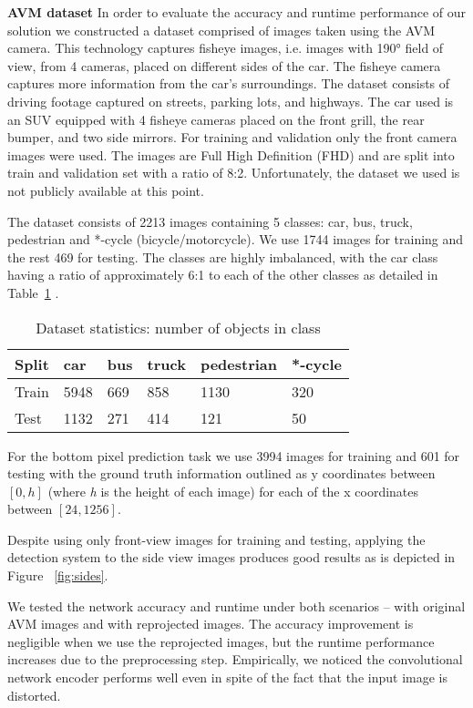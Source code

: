 \documentclass[10pt,twocolumn,letterpaper]{article}
\begin{document}
\textbf{AVM dataset } In order to evaluate the accuracy and runtime performance of our solution we constructed a dataset comprised of images taken using the AVM camera. This technology captures fisheye images, i.e. images with \ang{190} field of view, from 4 cameras, placed on different sides of the car. The fisheye camera captures more information from the car's surroundings. The dataset consists of driving footage captured on streets, parking lots, and highways. The car used is an SUV equipped with 4 fisheye cameras placed on the front grill, the rear bumper, and two side mirrors. For training and validation only the front camera images were used. The images are Full High Definition (FHD) and are split into train and validation set with a ratio of 8:2. Unfortunately, the dataset we used is not publicly available at this point.


The dataset consists of 2213 images containing 5 classes: car, bus, truck, pedestrian and *-cycle (bicycle/motorcycle). We use 1744 images for training and the rest 469 for testing. The classes are highly imbalanced, with the car class having a ratio of approximately 6:1 to each of the other classes as detailed in Table~\ref{db_stats} .
\begin{table}
\begin{center}
\begin{tabular}{l|l|l|l|l|l}
\textbf{Split} & \textbf{car} & \textbf{bus}  & \textbf{truck} & \textbf{pedestrian} & \textbf{*-cycle}\\\hline
Train & 5948  &669 &858 &1130 &320  \\
Test &1132 &271 &414 &121 &50        
\end{tabular}
\end{center}
\caption{Dataset statistics: number of objects in class}
\label{db_stats}
\end{table}

For the bottom pixel prediction task we use 3994 images for training and 601 for testing with the ground truth information outlined as y coordinates between $[0, h]$ (where \textit{h} is the height of each image) for each of the x coordinates between $[24, 1256]$.

Despite using only front-view images for training and testing, applying the detection system to the side view images produces good results as is depicted in Figure ~\ref{fig:sides}.

We tested the network accuracy and runtime under both scenarios – with original AVM images and with reprojected images. The accuracy improvement is negligible when we use the reprojected images, but the runtime performance increases due to the preprocessing step. Empirically, we noticed the convolutional network encoder performs well even in spite of the fact that the input image is distorted. 
\end{document}
